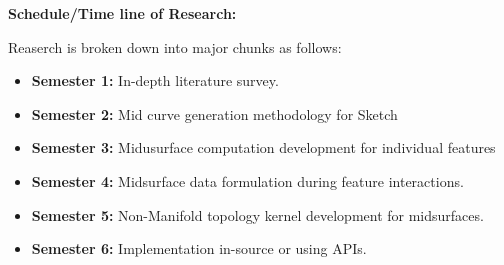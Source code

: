 \documentclass[a4paper]{article}
\begin{document}
\vskip5mm




\textbf{Schedule/Time line of Research:}

Reaserch is broken down into major chunks as follows:
\begin{itemize}
    \item \textbf{Semester 1:} In-depth literature survey.
    \item \textbf{Semester 2:} Mid curve generation methodology for Sketch
    \item \textbf{Semester 3:} Midusurface computation development for individual features
    \item \textbf{Semester 4:} Midsurface data formulation during feature interactions.
    \item \textbf{Semester 5:} Non-Manifold topology kernel development for midsurfaces.
    \item \textbf{Semester 6:} Implementation in-source or using APIs.
\end{itemize}

\vskip5mm






\end{document}
